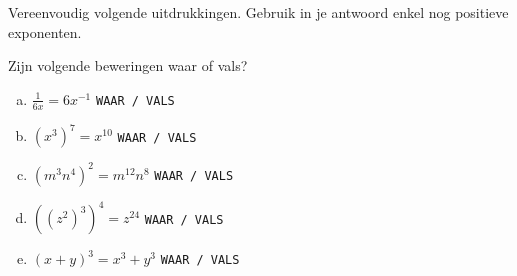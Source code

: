 \documentclass[12pt,twoside]{article}
\begin{document}
\begin{oefening}
Vereenvoudig volgende uitdrukkingen. Gebruik in je antwoord enkel nog positieve exponenten.
\begin{multicols}{2}
  \begin{enumerate}[(a)]
    \itemsep1em
  \item ${\left( {3{x^{ - 2}}{y^{ - 4}}} \right)^{ - 1}}$
  \item ${\left( {{{\left( {2{a^2}} \right)}^{ - 3}}{b^4}} \right)^{ - 3}}$
  \item $\displaystyle \frac{{{c^{ - 6}}{b^{10}}}}{{{b^9}{c^{ - 11}}}}$
  \item $\displaystyle \frac{{4{a^3}{{\left( {{b^2}a} \right)}^{ - 4}}}}{{{c^{ - 6} 7}}}}$
\item $\displaystyle \frac{{{{\left( {6{v^2}} \right)}^{ - 1}}{w^{ - 4}}}}{{{{\left( {2v} \right)}^{ - 3}}{w^{10}}}}$
\item ${\left( {\displaystyle \frac{{{{\left( {8{x^{21}}} \right)}^0}{y^{ - 3}}{x^8}}}{{{y^{ - 9}}{x^{ - 1}}}}} \right)^6}$
\item ${\left( {\displaystyle \frac{{{a^2}{b^{ - 4}}{c^{ - 1}}}}{{{b^{ - 9}}{c^8}{a^{ - 4}}}}} \right)^{ - 2}}$
\item ${\left( {\displaystyle \frac{{{p^{ - 6}}{q^7}{{\left( {{p^2}q} \right)}^{ - 3}}}}{{{{\left( {{p^{ - 1}}{q^{ - 4}}} \right)}^2}{p^{10}}}}} \right)^3}$
\end{enumerate}
\end{multicols}
\end{oefening}

\begin{oefening}
  Zijn volgende beweringen waar of vals?
  \begin{enumerate}[(a)]
    \itemsep1em
  \item $\displaystyle \frac{1}{{6x}} = 6{x^{ - 1}}$ \hfill \texttt{WAAR / VALS}\mbox{\hspace{5cm}}
  \item ${\left( {{x^3}} \right)^7} = {x^{10}}$ \hfill \texttt{WAAR / VALS}\mbox{\hspace{5cm}}
  \item ${\left( {{m^3}{n^4}} \right)^2} = {m^{12}}{n^8}$ \hfill \texttt{WAAR / VALS}\mbox{\hspace{5cm}}
  \item ${\left( {{{\left( {{z^2}} \right)}^3}} \right)^4} = {z^{24}}$ \hfill \texttt{WAAR / VALS}\mbox{\hspace{5cm}}
  \item ${\left( {x + y} \right)^3} = {x^3} + {y^3}$ \hfill \texttt{WAAR / VALS}\mbox{\hspace{5cm}}
  \end{enumerate}
\end{oefening}
\end{document}
